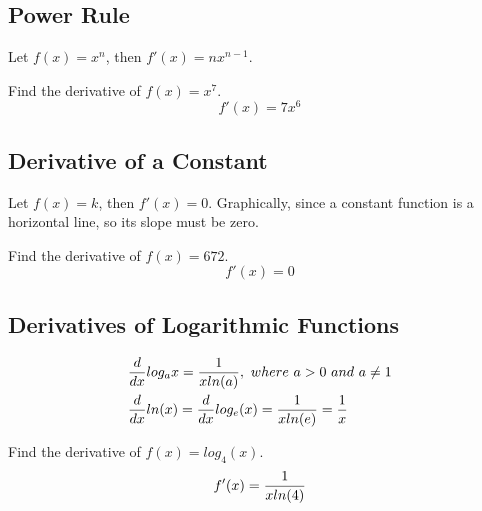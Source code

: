 \subsection{Power Rule}

\begin{theorem}
    Let $ f(x) = x^n $, then $ f'(x) = nx^{n-1} $.
\end{theorem}

\begin{exercise}\nonumber
    Find the derivative of $ f(x) = x^7 $. \\

    $$
        f'(x) = 7x^6
    $$
\end{exercise}

\subsection{Derivative of a Constant}

\begin{theorem}
    Let $ f(x) = k $, then $ f'(x) = 0 $. Graphically, since a constant function is a horizontal line, so its slope must be zero.
\end{theorem}

\begin{exercise}\nonumber
    Find the derivative of $ f(x) = 672 $. \\

    $$
        f'(x) = 0
    $$
\end{exercise}

\subsection{Derivatives of Logarithmic Functions}

\begin{theorem}
    \begin{align}
         & {d \over dx}log_a{x} = {1 \over xln(a)},\ where\ a > 0\ and\ a \neq 1     \\
         & {d \over dx}ln(x) = {d \over dx}log_e(x) = {1 \over xln(e)} = {1 \over x}
    \end{align}
\end{theorem}

\begin{exercise}\nonumber
    Find the derivative of $ f(x) = log_4(x) $. \\

    $$
        f'(x) = {1 \over xln(4)}
    $$
\end{exercise}

